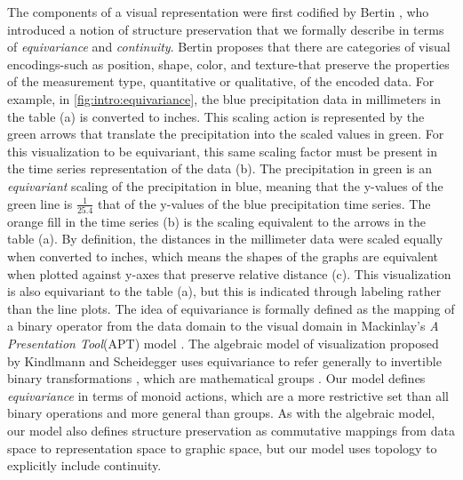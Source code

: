 \documentclass[../main.tex]{subfiles}
\begin{document}
The components of a visual representation were first codified by Bertin \cite{bertinSemiologyGraphicsDiagrams2011a}, who introduced a notion of structure preservation that we formally describe in terms of \textit{equivariance} and \textit{continuity}. Bertin proposes that there are categories of visual encodings-such as position, shape, color, and texture-that preserve the properties of the measurement type, quantitative or qualitative, of the encoded data. For example, in \autoref{fig:intro:equivariance}, the blue precipitation data in millimeters in the table (a) is converted to inches. This scaling action is represented by the green arrows that translate the precipitation into the scaled values in green. For this visualization to be equivariant, this same scaling factor must be present in the time series representation of the data (b). The precipitation in green is an \textit{equivariant} scaling of the precipitation in blue, meaning that the y-values of the green line is $\frac{1}{25.4}$ that of the y-values of the blue precipitation time series. The orange fill in the time series (b) is the scaling equivalent to the arrows in the table (a). By definition, the distances in the millimeter data were scaled equally \cite{stothersKleinViewGeometry} when converted to inches, which means the shapes of the graphs are equivalent when plotted against y-axes that preserve relative distance (c). This visualization is also equivariant to the table (a), but this is indicated through labeling rather than the line plots. The idea of equivariance is formally defined as the mapping of a binary operator from the data domain to the visual domain in Mackinlay's \textit{A Presentation Tool}(APT) model \cite{mackinlayAutomatingDesignGraphical1986, mackinlayAutomaticDesignGraphical1987}. The algebraic model of visualization proposed by Kindlmann and Scheidegger uses equivariance to refer generally to invertible binary transformations \cite{kindlmannAlgebraicProcessVisualization2014}, which are mathematical groups \cite{shadrachIntroductionGroups2017}. Our model defines \textit{equivariance} in terms of monoid actions, which are a more restrictive set than all binary operations and more general than groups. As with the algebraic model, our model also defines structure preservation as commutative mappings from data space to representation space to graphic space, but our model uses topology to explicitly include continuity.
\end{document}

